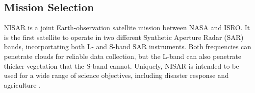 \subsection{Mission Selection}
NISAR is a joint Earth-observation satellite mission between NASA and ISRO. It is the first satellite to operate in two different Synthetic Aperture Radar (SAR) bands, incorportating both L- and S-band SAR instruments. Both frequencies can penetrate clouds for reliable data collection, but the L-band can also penetrate thicker vegetation that the S-band cannot. Uniquely, NISAR is intended to be used for a wide range of science objectives, including disaster response and agriculture \cite{NISARApps}.